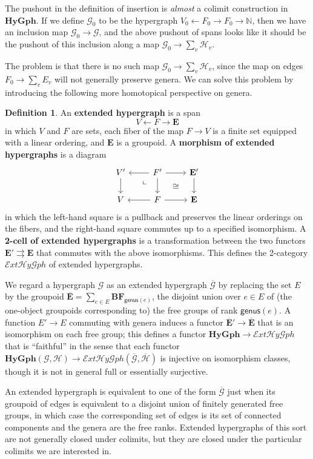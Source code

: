 \documentclass{article}
\theoremstyle{definition}
\newtheorem{defn}[thm]{Definition}
\theoremstyle{remark}
\def\G{\mathcal{G}}
\def\H{\mathcal{H}}
\newcommand{\dlpullback}[1][dl]{\ar[#1,phantom,near start,"\llcorner"]}
\let\ot\leftarrow
\def\genus{\mathsf{genus}}
\def\N{\mathbb{N}}
\def\hy{\mathbf{HyGph}}
\def\ehy{\mathcal{E}\mathit{xt}\mathcal{H}\mathit{y}\mathcal{G}\mathit{ph}}
\def\bE{\mathbf{E}}
\def\Ebar{\overline{\mathbf{E}}}
\def\Gbar{\overline{\mathcal{G}}}
\def\Hbar{\overline{\mathcal{H}}}
\begin{document}
The pushout in the definition of insertion is \emph{almost} a colimit construction in $\hy$.
If we define $\G_0$ to be the hypergraph $V_0 \ot F_0 \to F_0 \to \N$, then we have an inclusion map $\G_0\to \G$, and the above pushout of spans looks like it should be the pushout of this inclusion along a map $\G_0\to \sum_v \H_v$.

The problem is that there is no such map $\G_0\to \sum_v \H_v$, since the map on edges $F_0 \to \sum_v E_v$ will not generally preserve genera.
We can solve this problem by introducing the following more homotopical perspective on genera.

\begin{defn}
  An \textbf{extended hypergraph} is a span
  \[ V \ot F \to \bE \]
  in which $V$ and $F$ are sets, each fiber of the map $F\to V$ is a finite set equipped with a linear ordering, and $\bE$ is a groupoid.
  A \textbf{morphism of extended hypergraphs} is a diagram
  \[
  \begin{tikzcd}
    V' \ar[d] & F' \ar[d] \ar[r] \ar[l] \dlpullback[dl] \ar[dr,phantom,"\cong"] & \bE' \ar[d]\\
    V  & F \ar[r] \ar[l] & \bE
  \end{tikzcd}
  \]
  in which the left-hand square is a pullback and preserves the linear orderings on the fibers, and the right-hand square commutes up to a specified isomorphism.
  A \textbf{2-cell of extended hypergraphs} is a transformation between the two functors $\bE'\rightrightarrows \bE$ that commutes with the above isomorphisms.
  This defines the 2-category $\ehy$ of extended hypergraphs.
\end{defn}

We regard a hypergraph $\G$ as an extended hypergraph $\Gbar$ by replacing the set $E$ by the groupoid $\Ebar = \sum_{e\in E} \mathbf{B F}_{\genus(e)}$, the disjoint union over $e\in E$ of (the one-object groupoids corresponding to) the free groups of rank $\genus(e)$.
A function $E'\to E$ commuting with genera induces a functor $\Ebar' \to \Ebar$ that is an isomorphism on each free group; this defines a functor $\hy \to \ehy$ that is ``faithful'' in the sense that each functor $\hy(\G,\H) \to \ehy(\Gbar,\Hbar)$ is injective on isomorphism classes, though it is not in general full or essentially surjective.

An extended hypergraph is equivalent to one of the form $\Gbar$ just when its groupoid of edges is equivalent to a disjoint union of finitely generated free groups, in which case the corresponding set of edges is its set of connected components and the genera are the free ranks.
Extended hypergraphs of this sort are not generally closed under colimits, but they are closed under the particular colimits we are interested in.
\end{document}
